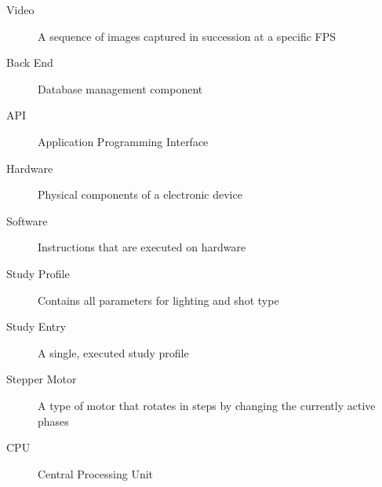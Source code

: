 \begin{description}
        \item[Video] A sequence of images captured in succession at a specific FPS
        \item[Back End] Database management component
        \item[API] Application Programming Interface
        \item[Hardware] Physical components of a electronic device
        \item[Software] Instructions that are executed on hardware
        \item[Study Profile] Contains all parameters for lighting and shot type
        \item[Study Entry] A single, executed study profile
        \item[Stepper Motor] A type of motor that rotates in steps by changing the currently active phases
        \item[CPU] Central Processing Unit
\end{description}